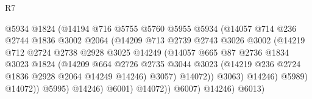 \begin{lexlean}{R7}
\begin{coremodule}
                                    @5934
                                    @1824
                                    (@14194
                                      @716
                                      @5755
                                      @5760
                                      @5955
                                      @5934
                                      (@14057
                                        @714
                                        @236
                                        @2744
                                        @1836
                                        @3002
                                        @2064
                                        (@14209
                                          @713
                                          @2739
                                          @2743
                                          @3026
                                          @3002
                                          (@14219
                                            @712
                                            @2724
                                            @2738
                                            @2928
                                            @3025
                                            @14249
                                            (@14057
                                              @665
                                              @87
                                              @2736
                                              @1834
                                              @3023
                                              @1824
                                              (@14209
                                                @664
                                                @2726
                                                @2735
                                                @3044
                                                @3023
                                                (@14219 @236 @2724 @1836 @2928 @2064 @14249 @14246)
                                                @3057)
                                              @14072))
                                          @3063)
                                        @14246)
                                      @5989)
                                    @14072))
                                @5995)
                              @14246)
                            @6001)
                          @14072))
                      @6007)
                    @14246)
                  @6013)

\end{coremodule}
\end{lexlean}
